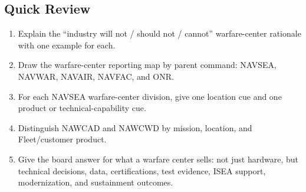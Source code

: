 \documentclass[../main.tex]{subfiles}
\begin{document}
\subsection{Quick Review}
\begin{enumerate}
  \item Explain the ``industry will not / should not / cannot'' warfare-center rationale with one example for each.
  \item Draw the warfare-center reporting map by parent command: NAVSEA, NAVWAR, NAVAIR, NAVFAC, and ONR.
  \item For each NAVSEA warfare-center division, give one location cue and one product or technical-capability cue.
  \item Distinguish NAWCAD and NAWCWD by mission, location, and Fleet/customer product.
  \item Give the board answer for what a warfare center sells: not just hardware, but technical decisions, data, certifications, test evidence, ISEA support, modernization, and sustainment outcomes.
\end{enumerate}

\end{document}
